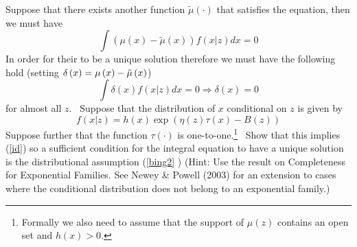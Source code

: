 \documentclass[12pt,english]{article}
\begin{document}
Suppose that there exists another function $%
\tilde{\mu}\left( \cdot \right) $ that satisfies the equation, then we must
have%
\begin{equation*}
\int \left( \mu \left( x\right) -\tilde{\mu}\left( x\right) \right) f\left(
x|z\right) dx=0
\end{equation*}%
In order for their to be a unique solution therefore we must have the
following hold (setting $\delta \left( x\right) =\mu \left( x\right) -\tilde{%
	\mu}\left( x\right) $)%
\begin{equation}
\int \delta \left( x\right) f\left( x|z\right) dx=0\Rightarrow \delta \left(
x\right) =0  \label{id}
\end{equation}%
for almost all $z.$ \ Suppose that the distribution of $x$ conditional on $z$
is given by%
\begin{equation}
f\left( x|z\right) =h\left( x\right) \exp\left(\eta \left(
z\right) \tau \left( x\right)-B(z)\right)  \label{bing2}
\end{equation}%
Suppose further that the function $\tau \left( \cdot \right) $ is
one-to-one.\footnote{Formally we also need to assume that the support
	of $\mu \left( z\right) $ contains an open set and $%
	h\left( x\right) >0$.} \ Show that this implies (\ref{id}) so a
sufficient condition for the integral equation to have a unique
solution is the distributional assumption (\ref{bing2}%
) (Hint: Use the result on Completeness for Exponential Families. See
Newey \& Powell (2003) for an extension to cases where the
conditional distribution does not belong to an exponential family.)
\end{document}
